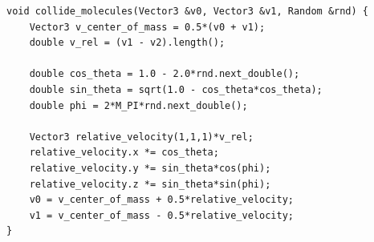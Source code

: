 \begin{lstlisting}[caption=Example code showing how to determine post-collision velocities., label=lst:post_collisions_velocities]
void collide_molecules(Vector3 &v0, Vector3 &v1, Random &rnd) {
    Vector3 v_center_of_mass = 0.5*(v0 + v1);
    double v_rel = (v1 - v2).length();
    
    double cos_theta = 1.0 - 2.0*rnd.next_double();
    double sin_theta = sqrt(1.0 - cos_theta*cos_theta);
    double phi = 2*M_PI*rnd.next_double();

    Vector3 relative_velocity(1,1,1)*v_rel;
    relative_velocity.x *= cos_theta;
    relative_velocity.y *= sin_theta*cos(phi);
    relative_velocity.z *= sin_theta*sin(phi);
    v0 = v_center_of_mass + 0.5*relative_velocity;
    v1 = v_center_of_mass - 0.5*relative_velocity;
}
\end{lstlisting}